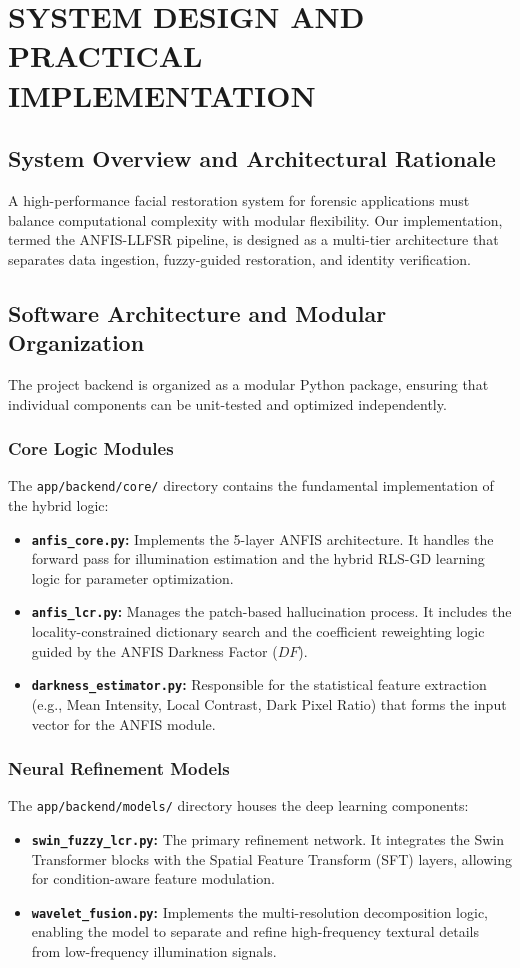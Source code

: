 \chapter{SYSTEM DESIGN AND PRACTICAL IMPLEMENTATION}

\section{System Overview and Architectural Rationale}
A high-performance facial restoration system for forensic applications must balance computational complexity with modular flexibility. Our implementation, termed the ANFIS-LLFSR pipeline, is designed as a multi-tier architecture that separates data ingestion, fuzzy-guided restoration, and identity verification.

\section{Software Architecture and Modular Organization}
The project backend is organized as a modular Python package, ensuring that individual components can be unit-tested and optimized independently.

\subsection{Core Logic Modules}
The \texttt{app/backend/core/} directory contains the fundamental implementation of the hybrid logic:
\begin{itemize}
    \item \textbf{\texttt{anfis\_core.py}:} Implements the 5-layer ANFIS architecture. It handles the forward pass for illumination estimation and the hybrid RLS-GD learning logic for parameter optimization.
    \item \textbf{\texttt{anfis\_lcr.py}:} Manages the patch-based hallucination process. It includes the locality-constrained dictionary search and the coefficient reweighting logic guided by the ANFIS Darkness Factor ($DF$).
    \item \textbf{\texttt{darkness\_estimator.py}:} Responsible for the statistical feature extraction (e.g., Mean Intensity, Local Contrast, Dark Pixel Ratio) that forms the input vector for the ANFIS module.
\end{itemize}

\subsection{Neural Refinement Models}
The \texttt{app/backend/models/} directory houses the deep learning components:
\begin{itemize}
    \item \textbf{\texttt{swin\_fuzzy\_lcr.py}:} The primary refinement network. It integrates the Swin Transformer blocks with the Spatial Feature Transform (SFT) layers, allowing for condition-aware feature modulation.
    \item \textbf{\texttt{wavelet\_fusion.py}:} Implements the multi-resolution decomposition logic, enabling the model to separate and refine high-frequency textural details from low-frequency illumination signals.
\end{itemize}

